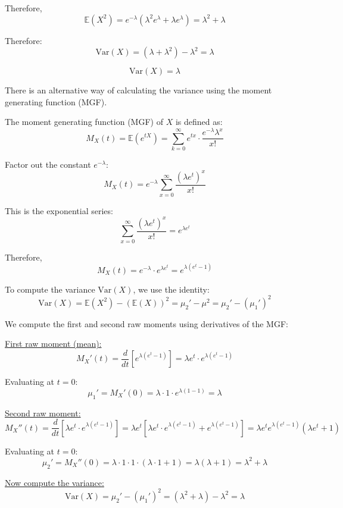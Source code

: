 \documentclass[twoside]{book}
\begin{document}
\begin{itemize}
Therefore,
\[
\mathbb{E}(X^2) = e^{-\lambda} \left( \lambda^2 e^{\lambda} + \lambda e^{\lambda} \right) = \lambda^2 + \lambda
\]

  Therefore:
    \[
    \text{Var}(X) = (\lambda + \lambda^2) - \lambda^2 = \lambda
    \]

    \begin{textbox}
        \[
    \text{Var}(X) = \lambda
    \]
    \end{textbox}

    \vspace{3mm}

    There is an alternative way of calculating the variance using the moment generating function (MGF).

    The moment generating function (MGF) of \( X \) is defined as:
    \[
M_X(t) = \mathbb{E}(e^{tX}) = \sum_{k=0}^{\infty} e^{t x} \cdot \frac{e^{-\lambda} \lambda^x}{x!}
\]

Factor out the constant \( e^{-\lambda} \):
\[
M_X(t) = e^{-\lambda} \sum_{x=0}^{\infty} \frac{(\lambda e^t)^x}{x!}
\]

This is the exponential series:
\[
\sum_{x=0}^{\infty} \frac{(\lambda e^t)^x}{x!} = e^{\lambda e^t}
\]

Therefore,
\[
M_X(t) = e^{-\lambda} \cdot e^{\lambda e^t} = e^{\lambda(e^t - 1)}
\]

To compute the variance \( \mathrm{Var}(X) \), we use the identity:
\[
\mathrm{Var}(X) = \mathbb{E}(X^2) - (\mathbb{E}(X))^2 = \mu_2' - \mu^2 = \mu_2' - (\mu_1')^2
\]

We compute the first and second raw moments using derivatives of the MGF:

\underline{First raw moment (mean):}
\[
M_X'(t) = \dfrac{d}{dt} \left[ e^{\lambda(e^t - 1)} \right]
= \lambda e^t \cdot e^{\lambda(e^t - 1)}
\]

Evaluating at \( t = 0 \):
\[
\mu_1' = M_X'(0) = \lambda \cdot 1 \cdot e^{\lambda(1 - 1)} = \lambda
\]

\underline{Second raw moment:}
\[
M_X''(t) = \dfrac{d}{dt} \left[ \lambda e^t \cdot e^{\lambda(e^t - 1)} \right]
= \lambda e^t \left[ \lambda e^t \cdot e^{\lambda(e^t - 1)} + e^{\lambda(e^t - 1)} \right]
= \lambda e^t e^{\lambda(e^t - 1)} (\lambda e^t + 1)
\]

Evaluating at \( t = 0 \):
\[
\mu_2' = M_X''(0) = \lambda \cdot 1 \cdot 1 \cdot (\lambda \cdot 1 + 1) = \lambda(\lambda + 1) = \lambda^2 + \lambda
\]

\underline{Now compute the variance:}
\[
\mathrm{Var}(X) = \mu_2' - (\mu_1')^2 = (\lambda^2 + \lambda) - \lambda^2 = \lambda
\]
\end{itemize}
\end{document}

